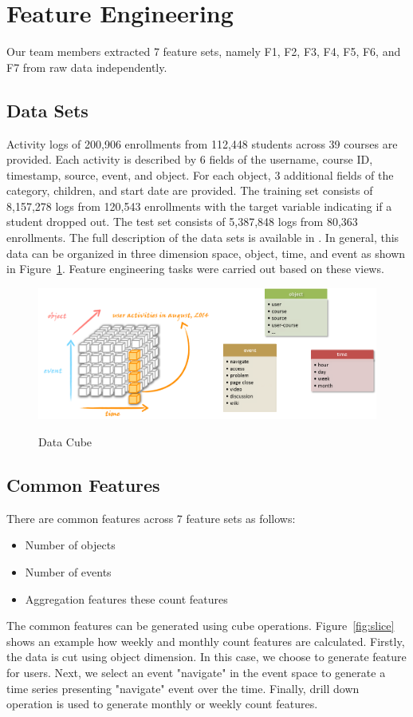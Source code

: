 \section{Feature Engineering}
Our team members extracted 7 feature sets, namely F1, F2, F3, F4, F5, F6, and F7 from raw data independently.

\subsection{Data Sets}
Activity logs of 200,906 enrollments from 112,448 students across 39 courses are provided.
Each activity is described by 6 fields of the username, course ID, timestamp, source, event, and object. 
For each object, 3 additional fields of the category, children, and start date are provided.
The training set consists of 8,157,278 logs from 120,543 enrollments with the target variable indicating if a student dropped out.  
The test set consists of 5,387,848 logs from 80,363 enrollments.
The full description of the data sets is available in \cite{kddcup2015_data}. In general, this data can be organized in three dimension space, object, time, and event as shown in Figure~\ref{fig:cube}. Feature engineering tasks were carried out based on these views.

\begin{figure}[!t]
	\caption{Data Cube}
	\centering
	\includegraphics[width=1 \textwidth]{cube}
	\label{fig:cube}
\end{figure}


\subsection{Common Features}
There are common features across 7 feature sets as follows:
\begin{itemize}
	\item Number of objects
	\item Number of events
	\item Aggregation features these count features
\end{itemize}
The common features can be generated using cube operations. Figure~\ref{fig:slice} shows an example how weekly and monthly count features are calculated. Firstly, the data is cut using object dimension. In this case, we choose to generate feature for users. Next, we select an event "navigate" in the event space to generate a time series presenting "navigate" event over the time. Finally, drill down operation is used to generate monthly or weekly count features.

